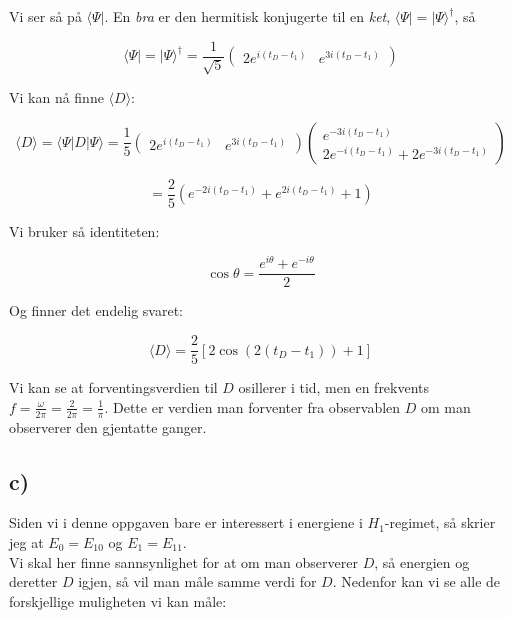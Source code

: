 \documentclass[a4paper,norsk, 10pt]{article}
\numberwithin{equation}{section}
\begin{document}
Vi ser så på $\langle \Psi |$. En \textit{bra} er den hermitisk konjugerte til en \textit{ket}, $\langle\Psi| = |\Psi\rangle^{\dag}$, så

$$
\langle\Psi| = |\Psi\rangle^{\dag} = \frac{1}{\sqrt{5}}
\begin{pmatrix}
2e^{i(t_D - t_1)} &
e^{3i(t_D - t_1)}
\end{pmatrix}
$$

Vi kan nå finne $\langle D \rangle$:

$$
\langle D\rangle = \langle\Psi | D | \Psi \rangle = 
\frac{1}{5}
\begin{pmatrix}
2e^{i(t_D - t_1)} &
e^{3i(t_D - t_1)}
\end{pmatrix}
\begin{pmatrix}
e^{-3i(t_D-t_1)}\\
2e^{-i(t_D-t_1)} + 2e^{-3i(t_D-t_1)}
\end{pmatrix}
$$

$$
= \frac{2}{5}\left(e^{-2i(t_D-t_1)} + e^{2i(t_D-t_1)} + 1\right)
$$

Vi bruker så identiteten:

$$
\cos \theta = \frac{e^{i\theta} + e^{-i\theta}}{2}
$$

Og finner det endelig svaret:

\begin{equation}
\langle D\rangle = \frac{2}{5}\left[2\cos(2(t_D - t_1)) + 1\right]
\end{equation}

Vi kan se at forventingsverdien til $D$ osillerer i tid, men en frekvents $f = \frac{\omega}{2\pi} = \frac{2}{2\pi} = \frac{1}{\pi}$. Dette er verdien man forventer fra observablen $D$ om man observerer den gjentatte ganger.

\subsection*{c)}

Siden vi i denne oppgaven bare er interessert i energiene i $H_1$-regimet, så skrier jeg at $E_0 = E_{10}$ og $E_1 = E_{11}$.\\

Vi skal her finne sannsynlighet for at om man observerer $D$, så energien og deretter $D$ igjen, så vil man måle samme verdi for $D$. Nedenfor kan vi se alle de forskjellige muligheten vi kan måle:
\end{document}

